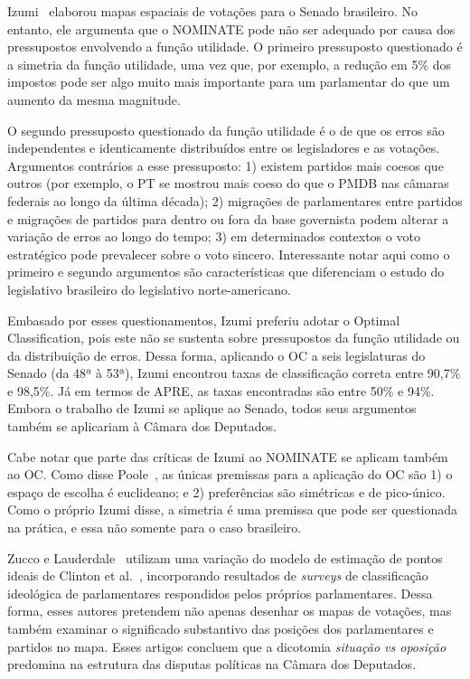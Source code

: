\documentclass[
	article,			%
	12pt,				%
	oneside,			%
	a4paper,			%
	english,			%
	brazil,				%
	sumario=tradicional,
	oldfontcommands %
	]{abntex2}
\newcommand\nominate{NOMINATE\xspace}
\begin{document}
Izumi~\cite{izumi2016senado} elaborou mapas espaciais de votações para o Senado brasileiro. No entanto, ele argumenta que o \nominate pode não ser adequado por causa dos pressupostos envolvendo a função utilidade. O primeiro pressuposto questionado é a simetria da função utilidade, uma vez que, por exemplo, a redução em 5\% dos impostos pode ser algo muito mais importante para um parlamentar do que um aumento da mesma magnitude.

O segundo pressuposto questionado da função utilidade é o de que os erros são independentes e identicamente distribuídos entre os legisladores e as votações. Argumentos contrários a esse pressuposto: 1) existem partidos mais coesos que outros (por exemplo, o PT se mostrou mais coeso do que o PMDB nas câmaras federais ao longo da última década); 2) migrações de parlamentares entre partidos e migrações de partidos para dentro ou fora da base governista podem alterar a variação de erros ao longo do tempo;  3) em determinados contextos o voto estratégico pode prevalecer sobre o voto sincero. Interessante notar aqui como o primeiro e segundo argumentos são características que diferenciam o estudo do legislativo brasileiro do legislativo norte-americano.

Embasado por esses questionamentos, Izumi preferiu adotar o Optimal Classification, pois este não se sustenta sobre pressupostos da função utilidade ou da distribuição de erros. Dessa forma, aplicando o OC a seis legislaturas do Senado (da 48ª à 53ª), Izumi encontrou taxas de classificação correta entre 90,7\% e 98,5\%. Já em termos de APRE, as taxas encontradas são entre 50\% e 94\%. Embora o trabalho de Izumi se aplique ao Senado, todos seus argumentos também se aplicariam à Câmara dos Deputados.

Cabe notar que parte das críticas de Izumi ao \nominate se aplicam também ao OC. Como disse Poole~\cite{poole2000oc}, as únicas premissas para a aplicação do OC são 1) o espaço de escolha é euclideano; e 2) preferências são simétricas e de pico-único. Como o próprio Izumi disse, a simetria é uma premissa que pode ser questionada na prática, e essa não somente para o caso brasileiro.

Zucco e Lauderdale~\cite{zucco2011ideologia, zucco2011distinguishing} utilizam uma variação do modelo de estimação de pontos ideais de Clinton et al.~\cite{clinton2004ideal}, incorporando resultados de \emph{surveys} de classificação ideológica de parlamentares respondidos pelos próprios parlamentares. Dessa forma, esses autores pretendem não apenas desenhar os mapas de votações, mas também examinar o significado substantivo das posições dos parlamentares e partidos no mapa. Esses artigos concluem que a dicotomia \emph{situação vs oposição} predomina na estrutura das disputas políticas na Câmara dos Deputados.
\end{document}
